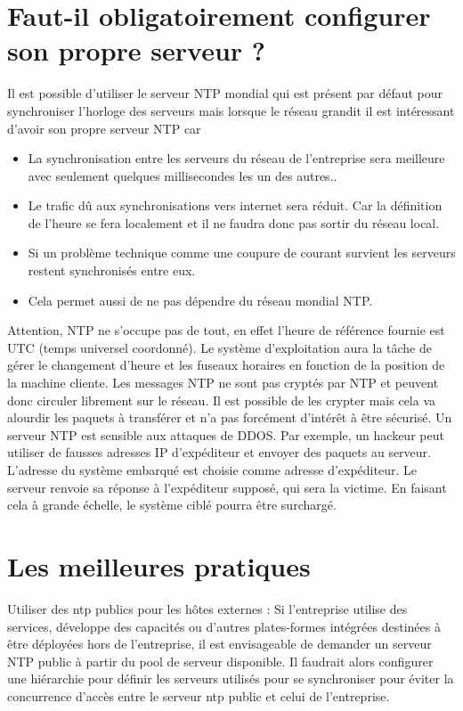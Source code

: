 \documentclass[a4paper]{article}
\begin{document}
\begin{adjustwidth}{-2cm}{-2cm}
\section{Faut-il obligatoirement configurer son propre serveur ?}
 Il est possible d’utiliser le serveur NTP mondial qui est présent par défaut pour synchroniser l’horloge des serveurs mais lorsque le réseau grandit il est intéressant d’avoir son propre serveur NTP car
\begin{itemize}
    \item La synchronisation entre les serveurs du réseau de l’entreprise sera meilleure avec seulement quelques millisecondes les un des autres..
    \item Le trafic dû aux synchronisations vers internet sera réduit. Car la définition de l’heure se fera localement et il ne faudra donc pas sortir du réseau local.
    \item Si un problème technique comme une coupure de courant survient les serveurs restent synchronisés entre eux.
    \item Cela permet aussi de ne pas dépendre du réseau mondial NTP.
\end{itemize} 
Attention, NTP ne s'occupe pas de tout, en effet l’heure de référence fournie est UTC (temps universel coordonné). Le système d’exploitation aura la tâche de gérer le changement d’heure et les fuseaux horaires en fonction de la position de la machine cliente.
Les messages NTP ne sont pas cryptés par NTP et peuvent donc circuler librement sur le réseau. Il est possible de les crypter mais cela va alourdir les paquets à transférer et n’a pas forcément d'intérêt à être sécurisé.
\newline
\newline
Un serveur NTP est sensible aux attaques de DDOS. Par exemple, un hackeur peut utiliser de fausses adresses IP d'expéditeur et envoyer des paquets au serveur. L’adresse du système embarqué est choisie comme adresse d’expéditeur. Le serveur renvoie sa réponse à l’expéditeur supposé, qui sera la victime. En faisant cela à grande échelle, le système ciblé pourra être surchargé.


 
 \newpage
\section{Les meilleures pratiques}
Utiliser des ntp publics pour les hôtes externes :
\newline
Si l’entreprise utilise des services, développe des capacités ou d’autres plates-formes intégrées destinées à être déployées hors de l’entreprise, il est envisageable de demander un serveur NTP public à partir du pool de serveur disponible. Il faudrait alors configurer une hiérarchie pour définir les serveurs utilisés pour se synchroniser pour éviter la concurrence d’accès entre le serveur ntp public et celui de l’entreprise.
\newline


\end{adjustwidth}
\end{document}

